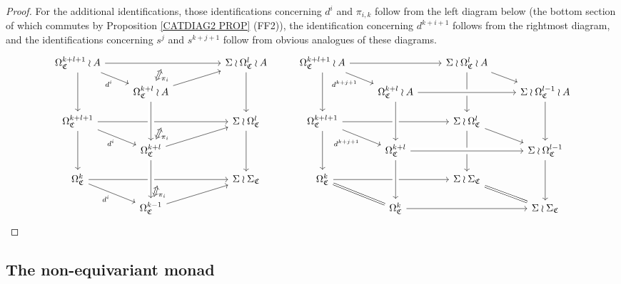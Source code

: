\documentclass[a4paper,10pt
,draft
]{article}%
\numberwithin{equation}{section}
\numberwithin{figure}{section}
\theoremstyle{definition} %
\newcommand{\1}{\ensuremath{\mathbbm 1}}%
\begin{document}
\begin{proof}
For the additional identifications, 
those identifications concerning $d^i$ and $\pi_{i,k}$
follow from the left diagram below 
(the bottom section of which commutes by 
Proposition \ref{CATDIAG2 PROP} (FF2)),
the identification concerning $d^{k+i+1}$ follows from the rightmost diagram, and the identifications concerning 
$s^j$ and $s^{k+j+1}$
follow from obvious analogues of these diagrams.
\[
\begin{tikzcd}[row sep = 10pt]
	\Omega^{k+l+1}_{\mathfrak{C}} \wr A \ar{rrr}[name=TT,swap]{} \ar{rd}[swap]{d^i} \ar{dd} &&&
	\Sigma \wr \Omega^{l}_{\mathfrak{C}} \wr A \ar{dd}
&
	\Omega^{k+l+1}_{\mathfrak{C}} \wr A \ar{rr} \ar{rd}[swap]{d^{k+j+1}} \ar{dd} &&
	\Sigma \wr \Omega^{l}_{\mathfrak{C}} \wr A \ar{rd} \ar{dd}
\\
	&
	|[alias=TD]|
	\Omega^{k+l}_{\mathfrak{C}} \wr A \ar{rru} &&
&
	&
	\Omega^{k+l}_{\mathfrak{C}} \wr A \arrow[rr, crossing over] &&
	\Sigma \wr \Omega^{l-1}_{\mathfrak{C}} \wr A 	 \ar{dd}
\\
	\Omega^{k+l+1}_{\mathfrak{C}} \ar{rrr}[name=MT,swap]{} \ar{rd}[swap]{d^i} \ar{dd} &&&
	\Sigma \wr \Omega^{l}_{\mathfrak{C}} \ar{dd}
&
	\Omega^{k+l+1}_{\mathfrak{C}} \ar{rr} \ar{rd}[swap]{d^{k+j+1}} \ar{dd}&&
	\Sigma \wr \Omega^{l}_{\mathfrak{C}} \ar{rd} \ar{dd}
\\
	&
	|[alias=MD]|
	\Omega^{k+l}_{\mathfrak{C}} \ar{rru} \arrow[uu, leftarrow, crossing over] &&
&
	&
	\Omega^{k+l}_{\mathfrak{C}} \arrow[rr, crossing over] \arrow[uu, leftarrow, crossing over] &&
	\Sigma \wr \Omega^{l-1}_{\mathfrak{C}} \ar{dd}
\\
	\Omega^{k}_{\mathfrak{C}} \ar{rrr}[name=DT,swap]{} \ar{rd}[swap]{d^i} &&&
	\Sigma \wr \Sigma_{\mathfrak{C}}
&
	\Omega^{k}_{\mathfrak{C}} \ar{rr} \ar[equal]{rd} &&
	\Sigma \wr \Sigma_{\mathfrak{C}} \ar[equal]{rd}
\\
	&
	|[alias=DD]|
	\Omega^{k-1}_{\mathfrak{C}} \ar{rru} \arrow[uu, leftarrow, crossing over] &&
&
	&
	\Omega^{k}_{\mathfrak{C}} \ar{rr} \arrow[uu, leftarrow, crossing over] &&
	\Sigma \wr \Sigma_{\mathfrak{C}} 
\arrow[Leftrightarrow, from=TT, to=TD,shorten >=0.05cm,shorten <=0.05cm,
"\pi_{i}"
]
\arrow[Leftrightarrow, from=MT, to=MD,shorten >=0.05cm,shorten <=0.05cm,
"\pi_{i}"
]
\arrow[Leftrightarrow, from=DT, to=DD,shorten >=0.05cm,shorten <=0.05cm,
"\pi_{i}"
]
\end{tikzcd}
\]
\end{proof}




\subsection{The non-equivariant monad} \label{NONEQMON SEC}
\end{document}
